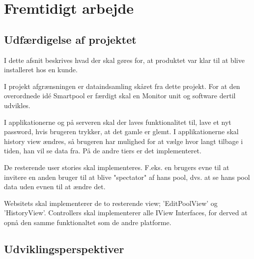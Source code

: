 \chapter{Fremtidigt arbejde}
\section{Udfærdigelse af projektet}
I dette afsnit beskrives hvad der skal gøres for, at produktet var klar til at blive installeret hos en kunde.

I projekt afgrænsningen er dataindsamling skåret fra dette projekt. For at den overordnede idé Smartpool er færdigt skal en Monitor unit og software dertil udvikles.

I applikationerne og på serveren skal der laves funktionalitet til, lave et nyt password, hvis brugeren trykker, at det gamle er glemt.
I applikationerne skal history view ændres, så brugeren har mulighed for at vælge hvor langt tilbage i tiden, han vil se data fra. På de andre tiers er det implementeret.

De resterende user stories skal implementeres. F.eks. en brugers evne til at invitere en anden bruger til at blive "spectator" af hans pool, dvs. at se hans pool data uden evnen til at ændre det.

Websitets skal implementerer de to resterende view; 'EditPoolView' og 'HistoryView'. Controllers skal implementerer alle IView Interfaces, for derved at opnå den samme funktionaltet som de andre platforme.  


\section{Udviklingsperspektiver}